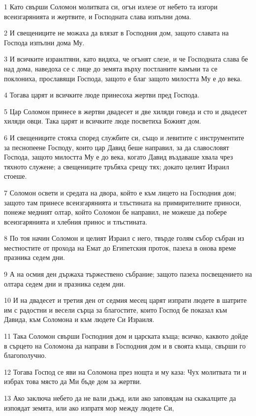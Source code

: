 \par 1 Като свърши Соломон молитвата си, огън излезе от небето та изгори всеизгарянията и жертвите, и Господната слава изпълни дома.
\par 2 И свещениците не можаха да влязат в Господния дом, защото славата на Господа изпълни дома Му.
\par 3 И всичките израилтяни, като видяха, че огънят слезе, и че Господната слава бе над дома, наведоха се с лице до земята върху постланите камъни та се поклониха, прославящи Господа, защото е благ защото милостта Му е до века.
\par 4 Тогава царят и всичките люде принесоха жертви пред Господа.
\par 5 Цар Соломон принесе в жертви двадесет и две хиляди говеда и сто и двадесет хиляди овци. Така царят и всичките люде посветиха Божият дом.
\par 6 И свещениците стояха според службите си, също и левитите с инструментите за песнопеене Господу, които цар Давид беше направил, за да славословят Господа, защото милостта Му е до века, когато Давид въздаваше хвала чрез тяхното служене; а свещениците тръбяха срещу тях; докато целият Израил стоеше.
\par 7 Соломон освети и средата на двора, който е към лицето на Господния дом; защото там принесе всеизгарянията и тлъстината на примирителните приноси, понеже медният олтар, който Соломон бе направил, не можеше да побере всеизгарянията и хлебния принос и тлъстината.
\par 8 По тоя начин Соломон и целият Израил с него, твърде голям събор събран из местностите от прохода на Емат до Египетския проток, пазеха в онова време празника седем дни.
\par 9 А на осмия ден държаха тържествено събрание; защото пазеха посвещението на олтара седем дни и празника седем дни.
\par 10 И на двадесет и третия ден от седмия месец царят изпрати людете в шатрите им с радостни и весели сърца за благостите, които Господ бе показал към Давида, към Соломона и към людете Си Израиля.
\par 11 Така Соломон свърши Господния дом и царската къща; всичко, каквото дойде в сърцето на Соломона да направи в Господния дом и в своята къща, свърши го благополучно.
\par 12 Тогава Господ се яви на Соломона през нощта и му каза: Чух молитвата ти и избрах това място да Ми бъде дом за жертви.
\par 13 Ако заключа небето да не вали дъжд, или ако заповядам на скакалците да изпоядат земята, или ако изпратя мор между людете Си,
